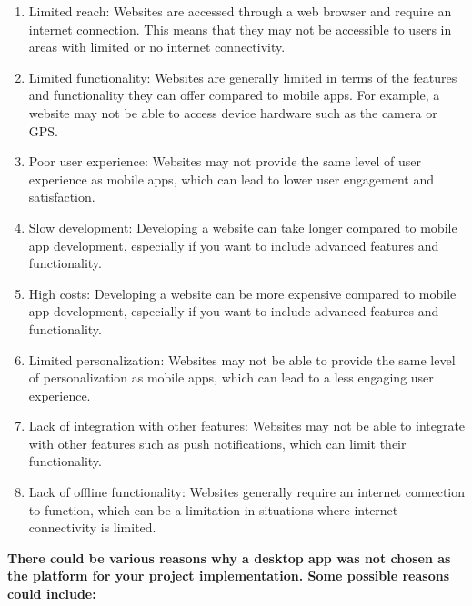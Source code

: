 \documentclass[12pt]{article}
\begin{document}
			\begin{enumerate}
				\item Limited reach: Websites are accessed through a web browser and require an internet connection. This means that they may not be accessible to users in areas with limited or no internet connectivity.
				\item Limited functionality: Websites are generally limited in terms of the features and functionality they can offer compared to mobile apps. For example, a website may not be able to access device hardware such as the camera or GPS.
				\item Poor user experience: Websites may not provide the same level of user experience as mobile apps, which can lead to lower user engagement and satisfaction.
				\item Slow development: Developing a website can take longer compared to mobile app development, especially if you want to include advanced features and functionality.
				\item High costs: Developing a website can be more expensive compared to mobile app development, especially if you want to include advanced features and functionality.
				\item Limited personalization: Websites may not be able to provide the same level of personalization as mobile apps, which can lead to a less engaging user experience.
				\item Lack of integration with other features: Websites may not be able to integrate with other features such as push notifications, which can limit their functionality.
				\item Lack of offline functionality: Websites generally require an internet connection to function, which can be a limitation in situations where internet connectivity is limited.
			\end{enumerate}
		\textbf{There could be various reasons why a desktop app was not chosen as the platform for your project implementation. Some possible reasons could include:}
\end{document}
